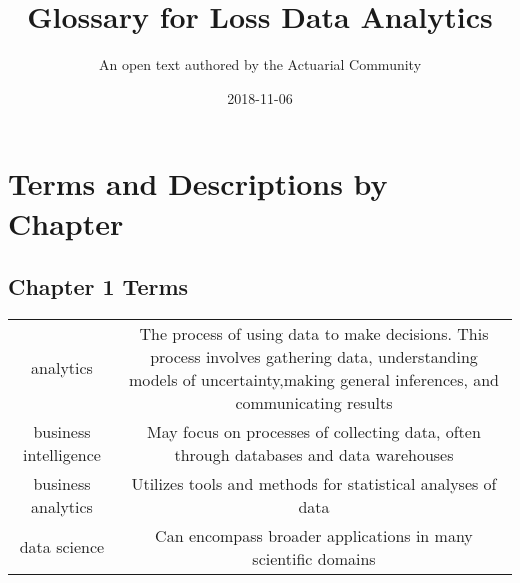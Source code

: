 \documentclass[]{book}
\title{Glossary for Loss Data Analytics}
\author{An open text authored by the Actuarial Community}
\date{2018-11-06}
\begin{document}
\maketitle

{
\setcounter{tocdepth}{1}
\tableofcontents
}
\chapter{Terms and Descriptions by
Chapter}\label{terms-and-descriptions-by-chapter}

\section{Chapter 1 Terms}\label{chapter-1-terms}

\begin{longtable}[]{@{}cc@{}}
\toprule
\begin{minipage}[t]{0.41\columnwidth}\centering\strut
analytics\strut
\end{minipage} & \begin{minipage}[t]{0.42\columnwidth}\centering\strut
The process of using data to make decisions. This process involves
gathering data, understanding models of uncertainty,making general
inferences, and communicating results\strut
\end{minipage}\tabularnewline
\begin{minipage}[t]{0.41\columnwidth}\centering\strut
business intelligence\strut
\end{minipage} & \begin{minipage}[t]{0.42\columnwidth}\centering\strut
May focus on processes of collecting data, often through databases and
data warehouses\strut
\end{minipage}\tabularnewline
\begin{minipage}[t]{0.41\columnwidth}\centering\strut
business analytics\strut
\end{minipage} & \begin{minipage}[t]{0.42\columnwidth}\centering\strut
Utilizes tools and methods for statistical analyses of data\strut
\end{minipage}\tabularnewline
\begin{minipage}[t]{0.41\columnwidth}\centering\strut
data science\strut
\end{minipage} & \begin{minipage}[t]{0.42\columnwidth}\centering\strut
Can encompass broader applications in many scientific domains\strut
\end{minipage}\tabularnewline

\end{longtable}
\end{document}
